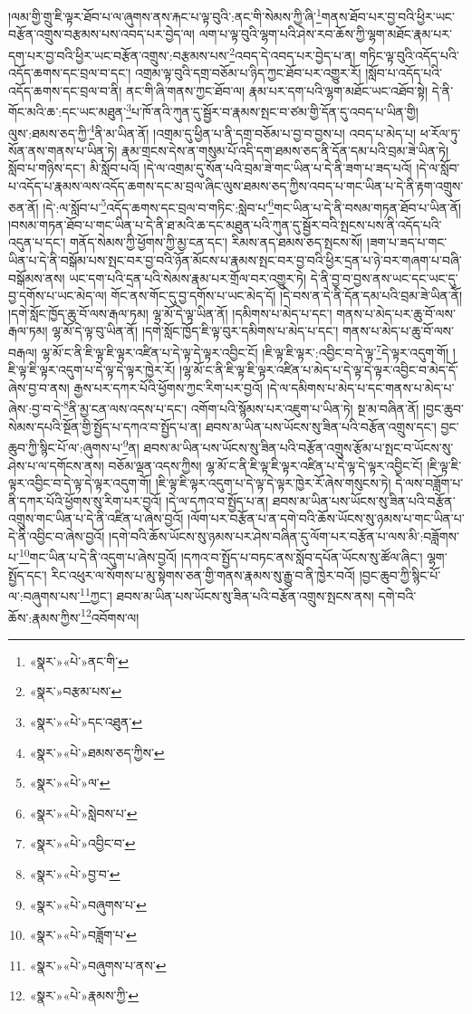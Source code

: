 །ལམ་གྱི་གྲུ་ཇི་ལྟར་ཐོབ་པ་ལ་ཞུགས་ནས་རྐང་པ་ལྟ་བུའི་:ནང་གི་སེམས་ཀྱི་ཞི་\footnote{«སྣར་»«པེ་»ནང་གི་}གནས་ཐོབ་པར་བྱ་བའི་ཕྱིར་ཡང་བརྩོན་འགྲུས་བརྩམས་པས་འབད་པར་བྱེད་ལ། ལག་པ་ལྟ་བུའི་ལྷག་པའི་ཤེས་རབ་ཆོས་ཀྱི་ལྷག་མཐོང་རྣམ་པར་དག་པར་བྱ་བའི་ཕྱིར་ཡང་བརྩོན་འགྲུས་:བརྩམས་པས་\footnote{«སྣར་»བརྩམ་པས་}འབད་དེ་འབད་པར་བྱེད་པ་ན། གཏིང་ལྟ་བུའི་འདོད་པའི་འདོད་ཆགས་དང་བྲལ་བ་དང་། འགྲམ་ལྟ་བུའི་དགྲ་བཅོམ་པ་ཉིད་ཀྱང་ཐོབ་པར་འགྱུར་རོ། །སློབ་པ་འདོད་པའི་འདོད་ཆགས་དང་བྲལ་བ་ནི། ནང་གི་ཞི་གནས་ཀྱང་ཐོབ་ལ། རྣམ་པར་དག་པའི་ལྷག་མཐོང་ཡང་འཐོབ་སྟེ། དེ་ནི་གོང་མའི་ཆ་:དང་ཡང་མཐུན་\footnote{«སྣར་»«པེ་»དང་འཐུན་}པ་ཁོ་ནའི་ཀུན་དུ་སྦྱོར་བ་རྣམས་སྤང་བ་ཙམ་གྱི་དོན་དུ་འབད་པ་ཡིན་གྱི། ལུས་:ཐམས་ཅད་ཀྱི་\footnote{«སྣར་»«པེ་»ཐམས་ཅད་ཀྱིས་}ནི་མ་ཡིན་ནོ། །འགྲམ་དུ་ཕྱིན་པ་ནི་དགྲ་བཅོམ་པ་བྱ་བ་བྱས་པ། འབད་པ་མེད་པ། ཕ་རོལ་ཏུ་སོན་ནས་གནས་པ་ཡིན་ཏེ། རྣམ་གྲངས་དེས་ན་གསུམ་པོ་འདི་དག་ཐམས་ཅད་ནི་དོན་དམ་པའི་བྲམ་ཟེ་ཡིན་ཏེ། སློབ་པ་གཉིས་དང་། མི་སློབ་པའོ། །དེ་ལ་འགྲམ་དུ་སོན་པའི་བྲམ་ཟེ་གང་ཡིན་པ་དེ་ནི་ཟག་པ་ཟད་པའོ། །དེ་ལ་སློབ་པ་འདོད་པ་རྣམས་ལས་འདོད་ཆགས་དང་མ་བྲལ་ཞིང་ལུས་ཐམས་ཅད་ཀྱིས་འབད་པ་གང་ཡིན་པ་དེ་ནི་རྟག་འགྲུས་ཅན་ནོ། །དེ་:ལ་སློབ་པ་\footnote{«སྣར་»«པེ་»ལ་}འདོད་ཆགས་དང་བྲལ་བ་གཏིང་:སླེབ་པ་\footnote{«སྣར་»«པེ་»སླེབས་པ་}གང་ཡིན་པ་དེ་ནི་བསམ་གཏན་ཐོབ་པ་ཡིན་ནོ། །བསམ་གཏན་ཐོབ་པ་གང་ཡིན་པ་དེ་ནི་ཐ་མའི་ཆ་དང་མཐུན་པའི་ཀུན་དུ་སྦྱོར་བའི་སྤངས་པས་ནི་འདོད་པའི་འདུན་པ་དང་། གནོད་སེམས་ཀྱི་ཕྱོགས་ཀྱི་མྱ་ངན་དང་། རིམས་ནད་ཐམས་ཅད་སྤངས་སོ། །ཟག་པ་ཟད་པ་གང་ཡིན་པ་དེ་ནི་བསྒོམ་པས་སྤང་བར་བྱ་བའི་ཉོན་མོངས་པ་རྣམས་སྤང་བར་བྱ་བའི་ཕྱིར་དྲན་པ་ཉེ་བར་གཞག་པ་བཞི་བསྒོམས་ནས། ཡང་དག་པའི་དྲན་པའི་སེམས་རྣམ་པར་གྲོལ་བར་འགྱུར་ཏེ། དེ་ནི་བྱ་བ་བྱས་ནས་ཡང་དང་ཡང་དུ་བྱ་དགོས་པ་ཡང་མེད་ལ། གོང་ནས་གོང་དུ་བྱ་དགོས་པ་ཡང་མེད་དོ། །དེ་བས་ན་དེ་ནི་དོན་དམ་པའི་བྲམ་ཟེ་ཡིན་ནོ། །དགེ་སློང་ཁྱོད་ཆུ་བོ་ལས་རྒལ་ཏམ། ལྷ་མོ་དེ་ལྟ་ཡིན་ནོ། །དམིགས་པ་མེད་པ་དང་། གནས་པ་མེད་པར་ཆུ་བོ་ལས་རྒལ་ཏམ། ལྷ་མོ་དེ་ལྟ་བུ་ཡིན་ནོ། །དགེ་སློང་ཁྱོད་ཇི་ལྟ་བུར་དམིགས་པ་མེད་པ་དང་། གནས་པ་མེད་པ་ཆུ་བོ་ལས་བརྒལ། ལྷ་མོ་ང་ནི་ཇི་ལྟ་ཇི་ལྟར་འཛིན་པ་དེ་ལྟ་དེ་ལྟར་འབྱིང་ངོ། །ཇི་ལྟ་ཇི་ལྟར་:འབྱིང་བ་དེ་ལྟ་\footnote{«སྣར་»«པེ་»འབྱིང་བ་}དེ་ལྟར་འདུག་གོ། །ཇི་ལྟ་ཇི་ལྟར་འདུག་པ་དེ་ལྟ་དེ་ལྟར་ཁྱེར་རོ། །ལྷ་མོ་ང་ནི་ཇི་ལྟ་ཇི་ལྟར་འཛིན་པ་མེད་པ་དེ་ལྟ་དེ་ལྟར་འབྱིང་བ་མེད་དོ་ཞེས་བྱ་བ་ནས། རྒྱས་པར་དཀར་པོའི་ཕྱོགས་ཀྱང་རིག་པར་བྱའོ། །དེ་ལ་དམིགས་པ་མེད་པ་དང་གནས་པ་མེད་པ་ཞེས་:བྱ་བ་དེ་\footnote{«སྣར་»«པེ་»བྱ་བ་}ནི་མྱ་ངན་ལས་འདས་པ་དང་། འགོག་པའི་སྙོམས་པར་འཇུག་པ་ཡིན་ཏེ། སྔ་མ་བཞིན་ནོ། །བྱང་ཆུབ་སེམས་དཔའི་སྔོན་གྱི་སྤྱོད་པ་དཀའ་བ་སྤྱོད་པ་ན། ཐབས་མ་ཡིན་པས་ཡོངས་སུ་ཟིན་པའི་བརྩོན་འགྲུས་དང་། བྱང་ཆུབ་ཀྱི་སྙིང་པོ་ལ་:ཞུགས་པ་\footnote{«སྣར་»«པེ་»བཞུགས་པ་}ན། ཐབས་མ་ཡིན་པས་ཡོངས་སུ་ཟིན་པའི་བརྩོན་འགྲུས་རྩོམ་པ་སྤང་བ་ཡོངས་སུ་ཤེས་པ་ལ་དགོངས་ནས། བཅོམ་ལྡན་འདས་ཀྱིས། ལྷ་མོ་ང་ནི་ཇི་ལྟ་ཇི་ལྟར་འཛིན་པ་དེ་ལྟ་དེ་ལྟར་འབྱིང་ངོ། །ཇི་ལྟ་ཇི་ལྟར་འབྱིང་བ་དེ་ལྟ་དེ་ལྟར་འདུག་གོ། །ཇི་ལྟ་ཇི་ལྟར་འདུག་པ་དེ་ལྟ་དེ་ལྟར་ཁྱེར་རོ་ཞེས་གསུངས་ཏེ། དེ་ལས་བཟློག་པ་ནི་དཀར་པོའི་ཕྱོགས་སུ་རིག་པར་བྱའོ། །དེ་ལ་དཀའ་བ་སྤྱོད་པ་ན། ཐབས་མ་ཡིན་པས་ཡོངས་སུ་ཟིན་པའི་བརྩོན་འགྲུས་གང་ཡིན་པ་དེ་ནི་འཛིན་པ་ཞེས་བྱའོ། །ལོག་པར་བརྩོན་པ་ན་དགེ་བའི་ཆོས་ཡོངས་སུ་ཉམས་པ་གང་ཡིན་པ་དེ་ནི་འབྱིང་བ་ཞེས་བྱའོ། །དགེ་བའི་ཆོས་ཡོངས་སུ་ཉམས་པར་ཤེས་བཞིན་དུ་ལོག་པར་བརྩོན་པ་ལས་མི་:བཟློགས་པ་\footnote{«སྣར་»«པེ་»བཟློག་པ་}གང་ཡིན་པ་དེ་ནི་འདུག་པ་ཞེས་བྱའོ། །དཀའ་བ་སྤྱོད་པ་བཏང་ནས་སློབ་དཔོན་ཡོངས་སུ་ཚོལ་ཞིང་། ལྷག་སྤྱོད་དང་། རིང་འཕུར་ལ་སོགས་པ་མུ་སྟེགས་ཅན་གྱི་གནས་རྣམས་སུ་རྒྱུ་བ་ནི་ཁྱེར་བའོ། །བྱང་ཆུབ་ཀྱི་སྙིང་པོ་ལ་:བཞུགས་པས་\footnote{«སྣར་»«པེ་»བཞུགས་པ་ནས་}ཀྱང་། ཐབས་མ་ཡིན་པས་ཡོངས་སུ་ཟིན་པའི་བརྩོན་འགྲུས་སྤངས་ནས། དགེ་བའི་ཆོས་:རྣམས་ཀྱིས་\footnote{«སྣར་»«པེ་»རྣམས་ཀྱི་}འབོགས་ལ། 